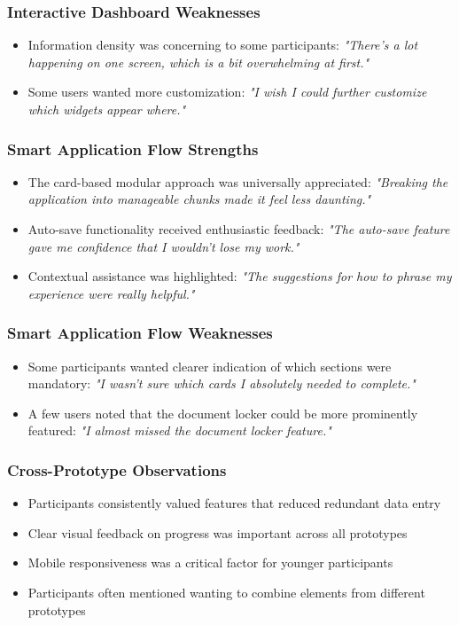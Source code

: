 \documentclass[
	letterpaper, %
]{jdf}
\begin{document}
\begin{sloppypar}
\subsubsection{Interactive Dashboard Weaknesses}
\begin{itemize}
    \item Information density was concerning to some participants: \textit{"There's a lot happening on one screen, which is a bit overwhelming at first."}
    \item Some users wanted more customization: \textit{"I wish I could further customize which widgets appear where."}
\end{itemize}

\subsubsection{Smart Application Flow Strengths}
\begin{itemize}
    \item The card-based modular approach was universally appreciated: \textit{"Breaking the application into manageable chunks made it feel less daunting."}
    \item Auto-save functionality received enthusiastic feedback: \textit{"The auto-save feature gave me confidence that I wouldn't lose my work."}
    \item Contextual assistance was highlighted: \textit{"The suggestions for how to phrase my experience were really helpful."}
\end{itemize}

\subsubsection{Smart Application Flow Weaknesses}
\begin{itemize}
    \item Some participants wanted clearer indication of which sections were mandatory: \textit{"I wasn't sure which cards I absolutely needed to complete."}
    \item A few users noted that the document locker could be more prominently featured: \textit{"I almost missed the document locker feature."}
\end{itemize}

\subsubsection{Cross-Prototype Observations}
\begin{itemize}
    \item Participants consistently valued features that reduced redundant data entry
    \item Clear visual feedback on progress was important across all prototypes
    \item Mobile responsiveness was a critical factor for younger participants
    \item Participants often mentioned wanting to combine elements from different prototypes
\end{itemize}


\end{sloppypar}
\end{document}
